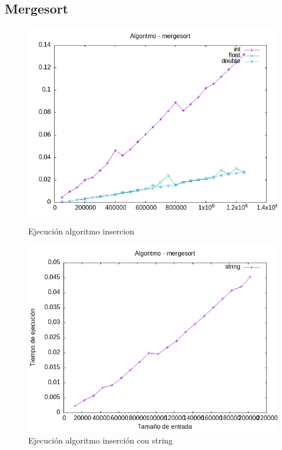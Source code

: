 \documentclass[11pt]{article}
\begin{document}
\subsection*{Mergesort}
\begin{figure}[H]
    \begin{minipage}{0.5\textwidth}
        \centering
        \includegraphics[width=\linewidth]{assets/Img/mergesort.png}
        \caption{Ejecución algoritmo insercion}
        \label{fig:insercion}
    \end{minipage}%
    \begin{minipage}{0.5\textwidth}
        \centering
        \includegraphics[width=\linewidth]{assets/Img/mergesortstring.png}
        \caption{Ejecución algoritmo inserción con string}
        \label{fig:insercionstring}
    \end{minipage}
\end{figure}
\end{document}
